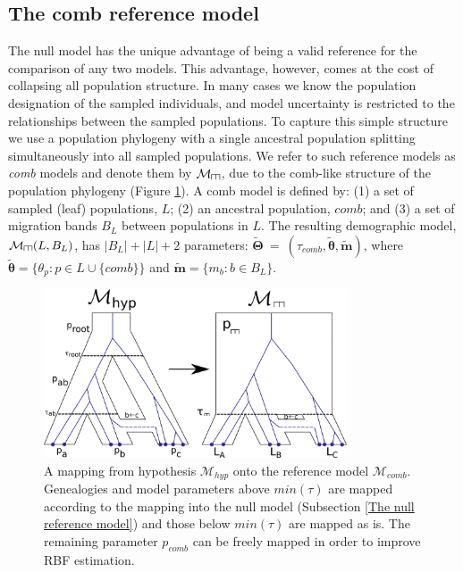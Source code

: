 \documentclass[11pt]{article}
\newcommand{\vect}[1]{\boldsymbol{\mathbf{#1}}}
\newcommand{\M}{\mathcal{M}}
\newcommand{\T}{\vect{\Theta}}
\newcommand{\Tref}{\widetilde{\T}}
\newcommand{\1}{\mathbbm{1}}
\def\comb{\rotatebox[origin=c]{90}{$\exists$}}
\newcommand{\Mcomb}{\M_{\comb}}
\newcommand{\thetas}{\vect\theta}
\newcommand{\migs}{\vect{m}}
\newcommand{\tacomb}{\tau_{comb}}
\def\comb{\rotatebox[origin=c]{90}{$\exists$}}
\begin{document}
\subsection{The comb reference model} \label{The comb reference model} 


The null model has the unique advantage of being a valid reference for the comparison of any two models.
This advantage, however, comes at the cost of collapsing all population structure.
%
In many cases we know the population designation of the sampled individuals, and model uncertainty is restricted to the relationships between the sampled populations.
%
To capture this simple structure we use a population phylogeny with a single ancestral population splitting simultaneously into all sampled populations.
We refer to such reference models as {\em comb} models and denote them by $\Mcomb$,  due to the comb-like structure of the population phylogeny (Figure \ref{fig:comb_model_with_migration_single_genealogy}).
%
A comb model is defined by: (1) a set of sampled (leaf) populations, $L$; (2) an ancestral population, $comb$; and (3) a set of migration bands $B_L$ between populations in $L$.
%
The resulting demographic model, $\Mcomb(L,B_L)$, has $|B_L|+|L|+2$ parameters: $\Tref ~=~ (\tacomb, \widetilde{\thetas},\widetilde{\migs})$,
where $\widetilde{\thetas}=\{\theta_p:p\in L\cup \{comb\}\}$ and $\widetilde{\migs} = \{m_b:b\in B_L\}$.
%

\begin{figure}[h]
\centering
\includegraphics[width=0.8\textwidth]
{comb_model_with_migration_single_genealogy}
\captionsetup{width=.8\textwidth}
\caption{A mapping from hypothesis $\M_{hyp}$ onto the 
reference model $\M_{comb}$. Genealogies and model parameters 
above $min(\tau)$ are mapped according to the mapping into the 
null model (Subsection \ref{The null reference model}) and those below $min(\tau)$ are mapped as is. The 
remaining parameter $p_{comb}$ can be freely mapped in order to improve RBF estimation. }
\label{fig:comb_model_with_migration_single_genealogy}
\end{figure}
\end{document}
